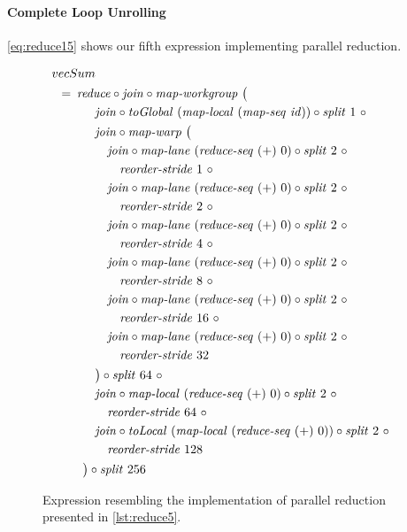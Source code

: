 \paragraph{Complete Loop Unrolling}
\autoref{eq:reduce15} shows our fifth expression implementing parallel reduction.
\begin{figure}
  \begin{align*}
    &\hspace{-1.5em}vecSum\\
    &\hspace{-2em}\quad\begin{aligned}
      &=\hspace{.2em}
        \reduce \circ \join \circ \mapWorkgroup\ \big(\\
      &\qquad\quad \join \circ \toGlobal\ (\mapLocal\ (\mapSeq\ \id)) \circ \splitN\ 1\ \circ\\
      &\qquad\quad \join \circ \mapWarp\ \big(\\
      &\qquad\qquad \join \circ \mapLane\ (\reduceSeq\ (+)\ 0) \circ \splitN\ 2\ \circ\\
      &\qquad\qquad\quad \reorderStride\ 1\ \circ\\
      &\qquad\qquad \join \circ \mapLane\ (\reduceSeq\ (+)\ 0) \circ \splitN\ 2\ \circ\\
      &\qquad\qquad\quad \reorderStride\ 2\ \circ\\
      &\qquad\qquad \join \circ \mapLane\ (\reduceSeq\ (+)\ 0) \circ \splitN\ 2\ \circ\\
      &\qquad\qquad\quad \reorderStride\ 4\ \circ\\
      &\qquad\qquad \join \circ \mapLane\ (\reduceSeq\ (+)\ 0) \circ \splitN\ 2\ \circ\\
      &\qquad\qquad\quad \reorderStride\ 8\ \circ\\
      &\qquad\qquad \join \circ \mapLane\ (\reduceSeq\ (+)\ 0) \circ \splitN\ 2\ \circ\\
      &\qquad\qquad\quad \reorderStride\ 16\ \circ\\
      &\qquad\qquad \join \circ \mapLane\ (\reduceSeq\ (+)\ 0) \circ \splitN\ 2\ \circ\\
      &\qquad\qquad\quad \reorderStride\ 32\\
      &\qquad\quad\big) \circ \splitN\ 64\ \circ\\
      &\qquad\quad \join \circ \mapLocal\ (\reduceSeq\ (+)\ 0) \circ \splitN\ 2\ \circ\\
      &\qquad\qquad \reorderStride\ 64\ \circ\\
      &\qquad\quad \join \circ \toLocal\ (\mapLocal\ (\reduceSeq\ (+)\ 0)) \circ \splitN\ 2\ \circ\\
      &\qquad\qquad \reorderStride\ 128\\
      &\qquad\big) \circ \splitN\ 256
    \end{aligned}
  \end{align*}
  \caption{Expression resembling the implementation of parallel reduction presented in \autoref{lst:reduce5}.}
  \label{eq:reduce15}
\end{figure}
